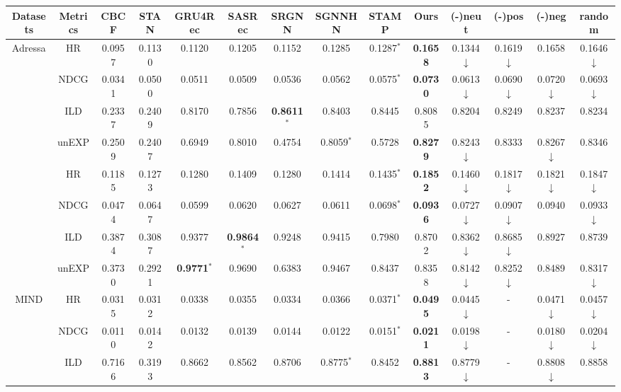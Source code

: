 \begin{table}[h]
{\begin{threeparttable}[b]
      \begin{tabular}{c|c|ccccccc|c|cccc}
      \toprule
      Datasets&Metrics&CBCF&STAN&GRU4Rec&SASRec&SRGNN&SGNNHN&STAMP&Ours&(-)neut&(-)pos&(-)neg&random \\ 
      \midrule
      \multirow{5}{*}{Adressa} & HR & 0.0957 & 0.1130 & 0.1120 & 0.1205 & 0.1152 & 0.1285 & 0.1287$^*$ & \textbf{0.1658} & 0.1344$\downarrow$ & 0.1619$\downarrow$ & 0.1658 &0.1646$\downarrow$\\ 
      \cline{2-14}
      & NDCG & 0.0341 & 0.0500 & 0.0511 & 0.0509 & 0.0536 & 0.0562 & 0.0575$^*$ & \textbf{0.0730}& 0.0613$\downarrow$ & 0.0690$\downarrow$ & 0.0720$\downarrow$ &0.0693$\downarrow$ \\ 
      \cline{2-14}
      & ILD & 0.2337 & 0.2409 & 0.8170 & 0.7856 & \textbf{0.8611}$^*$ & 0.8403 & 0.8445 & 0.8085& 0.8204 & 0.8249 & 0.8237 &0.8234\\ 
      \cline{2-14}
      & unEXP & 0.2509 & 0.2407 & 0.6949 & 0.8010  & 0.4754 & 0.8059$^*$ & 0.5728 & \textbf{0.8279}& 0.8243$\downarrow$ & 0.8333 & 0.8267$\downarrow$ &0.8346 \\ 
      \midrule
      \multirow{5}{*}{Globo} & HR & 0.1185 & 0.1273 & 0.1280 & 0.1409 & 0.1280 & 0.1414 & 0.1435$^*$ & \textbf{0.1852} & 0.1460$\downarrow$ & 0.1817$\downarrow$ & 0.1821$\downarrow$ &0.1847$\downarrow$\\ 
      \cline{2-14}
      & NDCG & 0.0474 & 0.0647 & 0.0599 & 0.0620 & 0.0627 & 0.0611 & 0.0698$^*$ & \textbf{0.0936}& 0.0727$\downarrow$ & 0.0907$\downarrow$ & 0.0940 &0.0933$\downarrow$\\ 
      \cline{2-14}
      & ILD & 0.3874 & 0.3087 & 0.9377 & \textbf{0.9864}$^*$ & 0.9248 & 0.9415 & 0.7980 & 0.8702 & 0.8362$\downarrow$ & 0.8685$\downarrow$ & 0.8927 &0.8739\\
      \cline{2-14}
      & unEXP & 0.3730 & 0.2921 & \textbf{0.9771}$^*$ &0.9690   & 0.6383  & 0.9467 &  0.8437 & 0.8358 & 0.8142$\downarrow$ & 0.8252$\downarrow$ & 0.8489& 0.8317$\downarrow$\\ 
      \midrule
      \multirow{5}{*}{MIND} & HR & 0.0315 & 0.0312 & 0.0338 & 0.0355 & 0.0334 & 0.0366 & 0.0371$^*$ & \textbf{0.0495} & 0.0445$\downarrow$ & - & 0.0471$\downarrow$ &0.0457$\downarrow$\\ 
      \cline{2-14}
      & NDCG & 0.0110 & 0.0142 & 0.0132 & 0.0139 & 0.0144 & 0.0122 & 0.0151$^*$ & \textbf{0.0211} & 0.0198$\downarrow$ & - & 0.0180$\downarrow$ &0.0204$\downarrow$\\
      \cline{2-14} 
      & ILD & 0.7166 & 0.3193 & 0.8662 & 0.8562 & 0.8706 & 0.8775$^*$ & 0.8452 & \textbf{0.8813} & 0.8779$\downarrow$ & - & 0.8808$\downarrow$ &0.8858\\ 

\end{tabular}
\end{threeparttable}}
\end{table}
